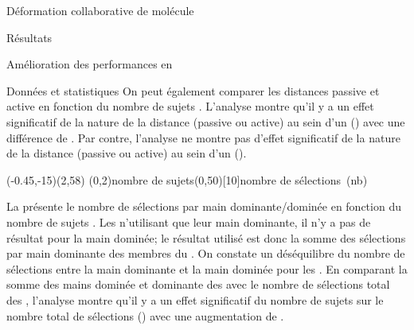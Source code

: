 \documentclass[myfrancais,ngerman,english,frenchb]{mythesis}
\begin{document}
\begin{mychapter}{Déformation collaborative de molécule}
\begin{mysection}{Résultats}
\begin{mysubsection}{Amélioration des performances en }
\begin{mysubsubsection}{Données et statistiques}
					On peut également comparer les distances passive et active en fonction du nombre de sujets .
					L'analyse montre qu'il y a un effet significatif de la nature de la distance (passive ou active) au sein d'un  () avec une différence de .
					Par contre, l'analyse ne montre pas d'effet significatif de la nature de la distance (passive ou active) au sein d'un  ().

					\begin{myfigure}
						\begin{myps}(-0.45,-15)(2,58)
							\myaxes(0,2){nombre de sujets}(0,50)[10]{nombre de sélections~(nb)}
						\end{myps}
					\end{myfigure}

					La  présente le nombre de sélections par main dominante/dominée  en fonction du nombre de sujets .
					Les  n'utilisant que leur main dominante, il n'y a pas de résultat pour la main dominée; le résultat utilisé est donc la somme des sélections par main dominante des membres du .
					On constate un déséquilibre du nombre de sélections entre la main dominante et la main dominée pour les .
					En comparant la somme des mains dominée et dominante des  avec le nombre de sélections total des , l'analyse montre qu'il y a un effet significatif du nombre de sujets  sur le nombre total de sélections  () avec une augmentation de .


\end{mysubsubsection}
\end{mysubsection}
\end{mysection}
\end{mychapter}
\end{document}
